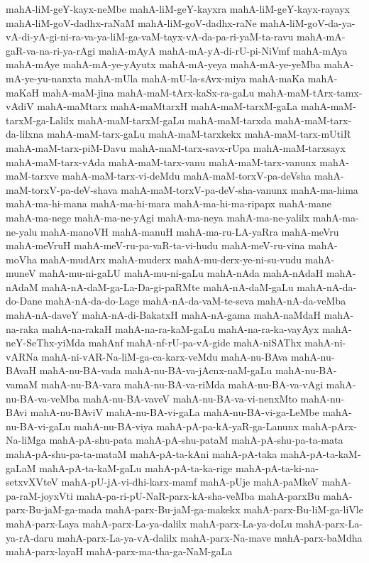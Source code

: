{mahA-liM-geY-kayx-neMbe
mahA-liM-geY-kayxra
mahA-liM-geY-kayx-rayayx
mahA-liM-goV-dadhx-raNaM
mahA-liM-goV-dadhx-raNe
mahA-liM-goV-da-ya-vA-di-yA-gi-ni-ra-va-ya-liM-ga-vaM-tayx-vA-da-pa-ri-yaM-ta-ravu
mahA-mA-gaR-va-na-ri-ya-rAgi
mahA-mAyA
mahA-mA-yA-di-rU-pi-NiVmf
mahA-mAya
mahA-mAye
mahA-mA-ye-yAyutx
mahA-mA-yeya
mahA-mA-ye-yeMba
mahA-mA-ye-yu-nanxta
mahA-mUla
mahA-mU-la-sAvx-miya
mahA-maKa
mahA-maKaH
mahA-maM-jina
mahA-maM-tArx-kaSx-ra-gaLu
mahA-maM-tArx-tamx-vAdiV
mahA-maMtarx
mahA-maMtarxH
mahA-maM-tarxM-gaLa
mahA-maM-tarxM-ga-Lalilx
mahA-maM-tarxM-gaLu
mahA-maM-tarxda
mahA-maM-tarx-da-lilxna
mahA-maM-tarx-gaLu
mahA-maM-tarxkekx
mahA-maM-tarx-mUtiR
mahA-maM-tarx-piM-Davu
mahA-maM-tarx-savx-rUpa
mahA-maM-tarxsayx
mahA-maM-tarx-vAda
mahA-maM-tarx-vanu
mahA-maM-tarx-vanunx
mahA-maM-tarxve
mahA-maM-tarx-vi-deMdu
mahA-maM-torxV-pa-deVsha
mahA-maM-torxV-pa-deV-shava
mahA-maM-torxV-pa-deV-sha-vanunx
mahA-ma-hima
mahA-ma-hi-mana
mahA-ma-hi-mara
mahA-ma-hi-ma-ripapx
mahA-mane
mahA-ma-nege
mahA-ma-ne-yAgi
mahA-ma-neya
mahA-ma-ne-yalilx
mahA-ma-ne-yalu
mahA-manoVH
mahA-manuH
mahA-ma-ru-LA-yaRra
mahA-meVru
mahA-meVruH
mahA-meV-ru-pa-vaR-ta-vi-hudu
mahA-meV-ru-vina
mahA-moVha
mahA-mudArx
mahA-muderx
mahA-mu-derx-ye-ni-su-vudu
mahA-muneV
mahA-mu-ni-gaLU
mahA-mu-ni-gaLu
mahA-nAda
mahA-nAdaH
mahA-nAdaM
mahA-nA-daM-ga-La-Da-gi-paRMte
mahA-nA-daM-gaLu
mahA-nA-da-do-Dane
mahA-nA-da-do-Lage
mahA-nA-da-vaM-te-seva
mahA-nA-da-veMba
mahA-nA-daveY
mahA-nA-di-BakatxH
mahA-nA-gama
mahA-naMdaH
mahA-na-raka
mahA-na-rakaH
mahA-na-ra-kaM-gaLu
mahA-na-ra-ka-vayAyx
mahA-neY-SeThx-yiMda
mahAnf
mahA-nf-rU-pa-vA-gide
mahA-niSAThx
mahA-ni-vARNa
mahA-ni-vAR-Na-liM-ga-ca-karx-veMdu
mahA-nu-BAva
mahA-nu-BAvaH
mahA-nu-BA-vada
mahA-nu-BA-va-jAcnx-naM-gaLu
mahA-nu-BA-vamaM
mahA-nu-BA-vara
mahA-nu-BA-va-riMda
mahA-nu-BA-va-vAgi
mahA-nu-BA-va-veMba
mahA-nu-BA-vaveV
mahA-nu-BA-va-vi-nenxMto
mahA-nu-BAvi
mahA-nu-BAviV
mahA-nu-BA-vi-gaLa
mahA-nu-BA-vi-ga-LeMbe
mahA-nu-BA-vi-gaLu
mahA-nu-BA-viya
mahA-pA-pa-kA-yaR-ga-Lanunx
mahA-pArx-Na-liMga
mahA-pA-shu-pata
mahA-pA-shu-pataM
mahA-pA-shu-pa-ta-mata
mahA-pA-shu-pa-ta-mataM
mahA-pA-ta-kAni
mahA-pA-taka
mahA-pA-ta-kaM-gaLaM
mahA-pA-ta-kaM-gaLu
mahA-pA-ta-ka-rige
mahA-pA-ta-ki-na-setxvXVteV
mahA-pU-jA-vi-dhi-karx-mamf
mahA-pUje
mahA-paMkeV
mahA-pa-raM-joyxVti
mahA-pa-ri-pU-NaR-parx-kA-sha-veMba
mahA-parxBu
mahA-parx-Bu-jaM-ga-mada
mahA-parx-Bu-jaM-ga-makekx
mahA-parx-Bu-liM-ga-liVle
mahA-parx-Laya
mahA-parx-La-ya-dalilx
mahA-parx-La-ya-doLu
mahA-parx-La-ya-rA-daru
mahA-parx-La-ya-vA-dalilx
mahA-parx-Na-mave
mahA-parx-baMdha
mahA-parx-layaH
mahA-parx-ma-tha-ga-NaM-gaLa
}
